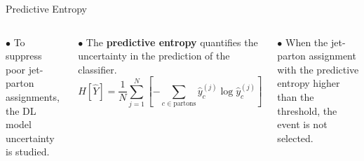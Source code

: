 \begin{frame}[fragile]{Predictive Entropy}
  \begin{columns}[T,onlytextwidth]

    $\bullet$ To suppress poor jet-parton assignments, the DL model uncertainty is studied.\\
    
    \medskip
    
    $\bullet$ The \textbf{predictive entropy} quantifies the uncertainty in the prediction of the classifier.
    \begin{equation*}
        H[\hat{Y}] = \frac{1}{N} \sum_{j=1}^{N} [ -\sum_{c \in \textrm{partons} } \hat{y}_{c}^{(j)} \log \hat{y}_{c}^{(j)} ]
    \end{equation*}
    
    $\bullet$ When the jet-parton assignment with the predictive entropy higher than the threshold, the event is not selected.


\end{columns}
\end{frame}
